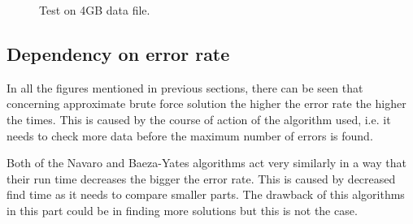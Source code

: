 \begin{figure}
\begin{minipage}{.5\linewidth}
\centering
{}
\end{minipage}%
\begin{minipage}{.5\linewidth}
\centering
{}
\end{minipage}\par\medskip

\caption{Test on 4GB data file.}
\label{fig_sizeRes}
\end{figure}


\subsection{Dependency on error rate}
In all the figures mentioned in previous sections, there can be seen that concerning approximate brute force solution the higher the error rate the higher the times. This is caused by the course of action of the algorithm used, i.e. it needs to check more data before the maximum number of errors is found.

Both of the Navaro and Baeza-Yates algorithms act very similarly in a way that their run time decreases the bigger the error rate. This is caused by decreased find time as it needs to compare smaller parts. The drawback of this algorithms in this part could be in finding more solutions but this is not the case.

